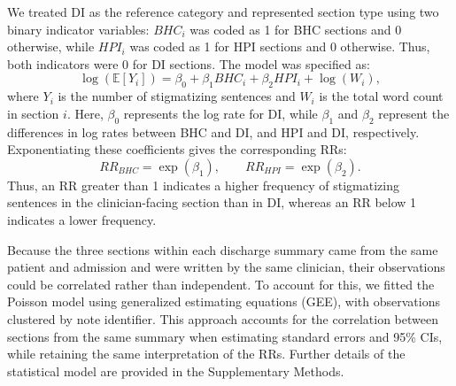 \documentclass[unnumsec,webpdf,contemporary,large]{oup-authoring-template}
\begin{document}
We treated DI as the reference category and represented section type using two binary indicator variables: \(BHC_i\) was coded as 1 for BHC sections and 0 otherwise, while \(HPI_i\) was coded as 1 for HPI sections and 0 otherwise. Thus, both indicators were 0 for DI sections. The model was specified as:
\begin{equation}
\log(\mathbb{E}[Y_i]) =
\beta_0 + \beta_1 BHC_i + \beta_2 HPI_i
+ \log(W_i),
\end{equation}
where \(Y_i\) is the number of stigmatizing sentences and \(W_i\) is the total word count in section \(i\). Here, \(\beta_0\) represents the log rate for DI, while \(\beta_1\) and \(\beta_2\) represent the differences in log rates between BHC and DI, and HPI and DI, respectively. Exponentiating these coefficients gives the corresponding RRs:
\begin{equation}
RR_{BHC} = \exp(\beta_1), \qquad
RR_{HPI} = \exp(\beta_2).
\end{equation}
Thus, an RR greater than 1 indicates a higher frequency of stigmatizing sentences in the clinician-facing section than in DI, whereas an RR below 1 indicates a lower frequency.

Because the three sections within each discharge summary came from the same patient and admission and were written by the same clinician, their observations could be correlated rather than independent. To account for this, we fitted the Poisson model using generalized estimating equations (GEE),\cite{zeger1986} with observations clustered by note identifier. This approach accounts for the correlation between sections from the same summary when estimating standard errors and 95\% CIs, while retaining the same interpretation of the RRs. %
Further details of the statistical model are provided in the Supplementary Methods.


\end{document}
